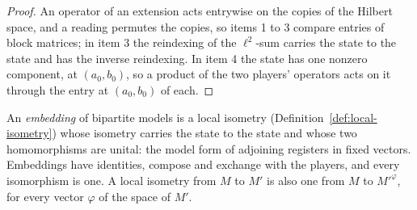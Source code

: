 \begin{proof}
\leanok
An operator of an extension acts entrywise on the copies of the Hilbert space, and a reading
permutes the copies, so items 1 to 3 compare entries of block matrices; in item 3 the reindexing of
the $\ell^2$-sum carries the state to the state and has the inverse reindexing. In item 4 the state
has one nonzero component, at $(a_0, b_0)$, so a product of the two players' operators acts on it
through the entry at $(a_0, b_0)$ of each.
\end{proof}

\begin{definition}
\label{def:model-embedding}
\leanok
An \emph{embedding} of bipartite models is a local isometry (Definition~\ref{def:local-isometry})
whose isometry carries the state to the state and whose two homomorphisms are unital: the model form
of adjoining registers in fixed vectors. Embeddings have identities, compose and exchange with the
players, and every isomorphism is one. A local isometry from $M$ to $M'$ is also one from $M$ to
$M'^{\varphi}$, for every vector $\varphi$ of the space of $M'$.
\end{definition}

